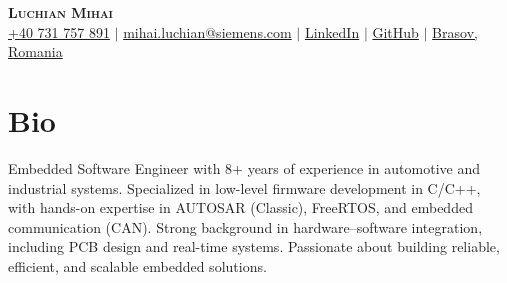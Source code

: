 \documentclass[letterpaper,11pt]{article}
\begin{document}

\begin{center}
    \textbf{\Huge \scshape Luchian Mihai} \\ \vspace{3pt}
    \small
    \faMobile \hspace{.5pt} \href{tel:+40731757891}{+40 731 757 891}
    $|$
    \faAt \hspace{.5pt} \href{mailto:mihai.luchian@siemens.com}{mihai.luchian@siemens.com}
    $|$
    \faLinkedinSquare \hspace{.5pt} \href{https://www.linkedin.com/in/luchian-mihai}{LinkedIn}
    $|$
    \faGithub \hspace{.5pt} \href{https://github.com/LuchianMihai}{GitHub}
    $|$
    \faMapMarker \hspace{.5pt} \href{https://www.google.com/maps/place/Bra%C8%99ov/@45.6525685,25.5140627,12z/data=!3m1!4b1!4m6!3m5!1s0x40b35b862aa214f1:0x6cf5f2ef54391e0f!8m2!3d45.6426802!4d25.5887252!16zL20vMGhqdGc?entry=ttu}{Brasov, Romania}
\end{center}


\section{Bio}
\begin{center}
\begin{minipage}{0.86\textwidth}
\small\raggedright
Embedded Software Engineer with 8+ years of experience in automotive and industrial systems. Specialized in low-level firmware development in C/C++, with hands-on expertise in AUTOSAR (Classic), FreeRTOS, and embedded communication (CAN). Strong background in hardware--software integration, including PCB design and real-time systems. Passionate about building reliable, efficient, and scalable embedded solutions.
\end{minipage}
\end{center}

\end{document}
